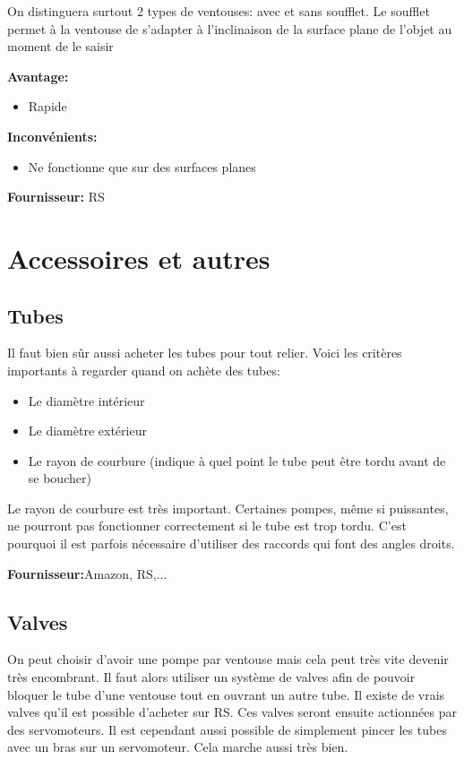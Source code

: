 \documentclass[a4paper, 11pt]{report}
\begin{document}
On distinguera surtout 2 types de ventouses: avec et sans soufflet. Le soufflet permet à la ventouse de s'adapter à l'inclinaison de la surface plane de l'objet au moment de le saisir

\textbf{Avantage:}
\begin{itemize}
\item Rapide
\end{itemize}

\textbf{Inconvénients:}
\begin{itemize}
\item Ne fonctionne que sur des surfaces planes
\end{itemize}

\textbf{Fournisseur:} RS

\section{Accessoires et autres}

\subsection{Tubes}

Il faut bien sûr aussi acheter les tubes pour tout relier. Voici les critères importants à regarder quand on achète des tubes:
\begin{itemize}
\item Le diamètre intérieur
\item Le diamètre extérieur
\item Le rayon de courbure (indique à quel point le tube peut être tordu avant de se boucher)
\end{itemize}

Le rayon de courbure est très important. Certaines pompes, même si puissantes, ne pourront pas fonctionner correctement si le tube est trop tordu. C'est pourquoi il est parfois nécessaire d'utiliser des raccords qui font des angles droits.

\textbf{Fournisseur:}Amazon, RS,...

\subsection{Valves}
On peut choisir d'avoir une pompe par ventouse mais cela peut très vite devenir très encombrant. Il faut alors utiliser un système de valves afin de pouvoir bloquer le tube d'une ventouse tout en ouvrant un autre tube. Il existe de vrais valves qu'il est possible d'acheter sur RS. Ces valves seront ensuite actionnées par des servomoteurs. Il est cependant aussi possible de simplement pincer les tubes avec un bras sur un servomoteur. Cela marche aussi très bien.
\end{document}
